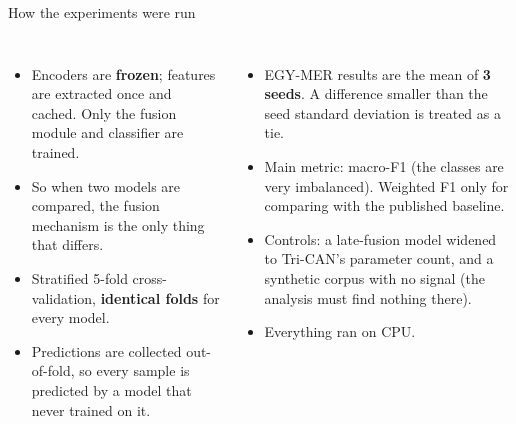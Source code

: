 \documentclass[aspectratio=169,10pt]{beamer}
\begin{document}
\begin{frame}[t]{How the experiments were run}
\begin{columns}[T,onlytextwidth]
\begin{itemize}
\item Encoders are \textbf{frozen}; features are extracted once and cached.
      Only the fusion module and classifier are trained.
\item So when two models are compared, the fusion mechanism is the only thing that differs.
\item Stratified 5-fold cross-validation, \textbf{identical folds} for every model.
\item Predictions are collected out-of-fold, so every sample is predicted by a
      model that never trained on it.
\end{itemize}
\begin{itemize}
\item EGY-MER results are the mean of \textbf{3 seeds}. A difference smaller
      than the seed standard deviation is treated as a tie.
\item Main metric: macro-F1 (the classes are very imbalanced).
      Weighted F1 only for comparing with the published baseline.
\item Controls: a late-fusion model widened to Tri-CAN's parameter count,
      and a synthetic corpus with no signal (the analysis must find nothing there).
\item Everything ran on CPU.
\end{itemize}
\end{columns}
\end{frame}
\end{document}
